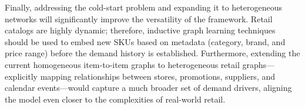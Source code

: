 Finally, addressing the cold-start problem and expanding it to heterogeneous networks will significantly improve the versatility of the framework. Retail catalogs are highly dynamic; therefore, inductive graph learning techniques should be used to embed new SKUs based on metadata (category, brand, and price range) before the demand history is established. Furthermore, extending the current homogeneous item-to-item graphs to heterogeneous retail graphs—explicitly mapping relationships between stores, promotions, suppliers, and calendar events—would capture a much broader set of demand drivers, aligning the model even closer to the complexities of real-world retail.